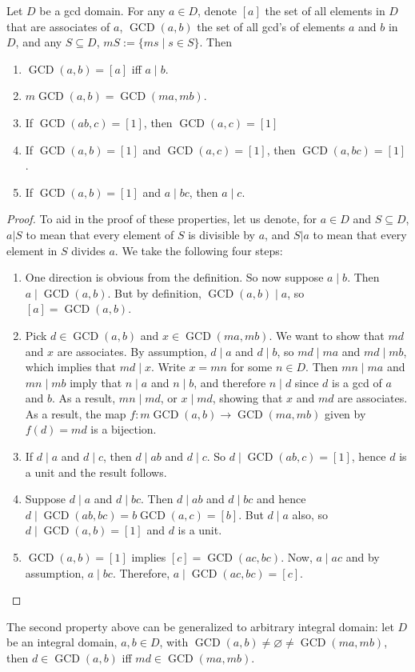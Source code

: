 \documentclass[12pt]{article}
\newcommand{\GCD}{\operatorname{GCD}}
\begin{document}
Let $D$ be a gcd domain.  For any $a\in D$, denote $[a]$ the set of all elements in $D$ that are associates of $a$, $\GCD(a,b)$ the set of all gcd's of elements $a$ and $b$ in $D$, and any $S\subseteq D$, $mS:=\lbrace ms\mid s\in S\rbrace$.  Then
\begin{enumerate}
\item $\GCD(a,b)=[a]$ iff $a\mid b$.
\item $m\GCD(a,b)= \GCD(ma,mb)$.
\item If $\GCD(ab,c)=[1]$, then $\GCD(a,c)=[1]$
\item If $\GCD(a,b)=[1]$ and $\GCD(a,c)=[1]$, then $\GCD(a,bc)=[1]$.
\item If $\GCD(a,b)=[1]$ and $a\mid bc$, then $a\mid c$.
\end{enumerate}
\begin{proof}  To aid in the proof of these properties, let us denote, for $a\in D$ and $S\subseteq D$, $a|S$ to mean that every element of $S$ is divisible by $a$, and $S|a$ to mean that every element in $S$ divides $a$.
We take the following four steps:
\begin{enumerate}
\item One direction is obvious from the definition.  So now suppose $a\mid b$.  Then $a\mid\GCD(a,b)$.  But by
definition, $\GCD(a,b)\mid a$, so $[a]=\GCD(a,b)$.
\item Pick $d \in \GCD(a,b)$ and $x\in \GCD(ma,mb)$.  We want to show that $md$ and $x$ are associates.  By assumption, $d\mid a$ and $d\mid b$, so $md\mid ma$ and $md\mid mb$, which implies that $md\mid x$.  Write $x=mn$ for some $n\in D$.  Then $mn\mid ma$ and $mn\mid mb$ imply that $n\mid a$ and $n\mid b$, and therefore $n\mid d$ since $d$ is a gcd of $a$ and $b$.  As a result, $mn\mid md$, or $x\mid md$, showing that $x$ and $md$ are associates.  As a result, the map $f: m\GCD(a,b)\to \GCD(ma,mb)$ given by $f(d)=md$ is a bijection.
\item If $d\mid a$ and $d\mid c$, then $d\mid ab$ and $d\mid c$.  So $d\mid\GCD(ab,c)=[1]$, hence $d$ is a unit and
the result follows.
\item Suppose $d\mid a$ and $d\mid bc$.  Then $d\mid ab$ and $d\mid bc$ and hence $d\mid\GCD(ab,bc)=b\GCD(a,c)=[b]$.  But $d\mid a$ also, so $d\mid\GCD(a,b)=[1]$ and $d$ is a unit.
\item $\GCD(a,b)=[1]$ implies $[c]=\GCD(ac,bc)$.  Now, $a\mid ac$ and by assumption, $a\mid bc$.  Therefore,
$a\mid\GCD(ac,bc)=[c]$.
\end{enumerate}
\end{proof}

The second property above can be generalized to arbitrary integral domain: let $D$ be an integral domain, $a,b\in D$, with $\GCD(a,b)\ne \varnothing \ne \GCD(ma,mb)$, then $d\in \GCD(a,b)$ iff $md \in \GCD(ma,mb)$.
\end{document}
